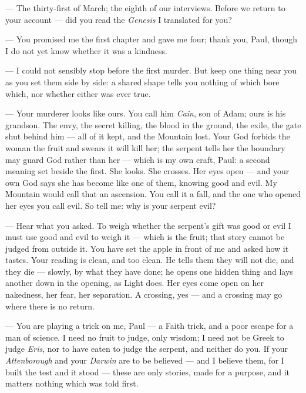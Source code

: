 

\begin{room}


--- The thirty-first of March; the eighth of our interviews. Before we return to your account --- did you read the \textit{Genesis} I translated for you?

--- You promised me the first chapter and gave me four; thank you, Paul, though I do not yet know whether it was a kindness.

--- I could not sensibly stop before the first murder. But keep one thing near you as you set them side by side: a shared shape tells you nothing of which bore which, nor whether either was ever true.

--- Your murderer looks like ours. You call him \textit{Cain}, son of Adam; ours is his grandson. The envy, the secret killing, the blood in the ground, the exile, the gate shut behind him --- all of it kept, and the Mountain lost. Your God forbids the woman the fruit and swears it will kill her; the serpent tells her the boundary may guard God rather than her --- which is my own craft, Paul: a second meaning set beside the first. She looks. She crosses. Her eyes open --- and your own God says she has become like one of them, knowing good and evil. My Mountain would call that an ascension. You call it a fall, and the one who opened her eyes you call evil. So tell me: why is your serpent evil?

--- Hear what you asked. To weigh whether the serpent's gift was good or evil I must use good and evil to weigh it --- which is the fruit; that story cannot be judged from outside it. You have set the apple in front of me and asked how it tastes. Your reading is clean, and too clean. He tells them they will not die, and they die --- slowly, by what they have done; he opens one hidden thing and lays another down in the opening, as Light does. Her eyes come open on her nakedness, her fear, her separation. A crossing, yes --- and a crossing may go where there is no return.

--- You are playing a trick on me, Paul --- a Faith trick, and a poor escape for a man of science. I need no fruit to judge, only wisdom; I need not be Greek to judge \textit{Eris}, nor to have eaten to judge the serpent, and neither do you. If your \textit{Attenborough} and your \textit{Darwin} are to be believed --- and I believe them, for I built the test and it stood --- these are only stories, made for a purpose, and it matters nothing which was told first. 


\end{room}
